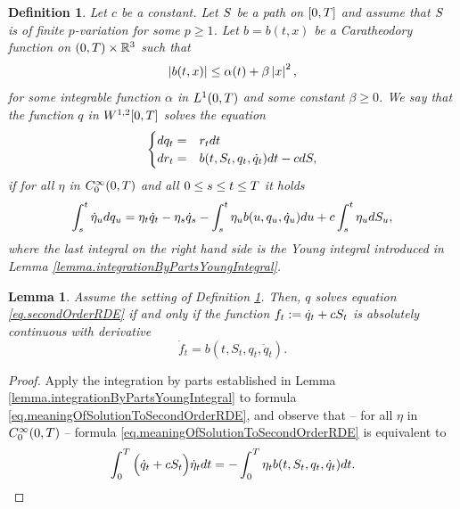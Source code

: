 \documentclass[10pt,a4paper]{article}
\newtheorem{defi}[thm]{Definition}
\newtheorem{lemma}[thm]{Lemma}
\begin{document}
\begin{appendices}
\begin{defi}\label{defi.solutionToSecondOrderRDE}
	Let $c$ be a constant. Let $S$ be  a path on ${[0,T]}$ and assume that $S$ is of finite $p$-variation for some $p\geq 1$. Let $b=b(t,x)$ be a Caratheodory function on $(0,T)\times \mathbb{R}^{3}$ such that 
	\begin{equation*}
	\left\lvert {b(t,x)} \right\rvert \leq \alpha(t) + \beta \left\lvert {x} \right\rvert^{2},
	\end{equation*}
	for some integrable function $\alpha$ in $L^1(0,T)$ and some constant $\beta \geq 0$. We say that the function $q$ in $W^{1,2}{[0,T]}$ solves the equation
	\begin{equation}\label{eq.secondOrderRDE}
	\begin{cases}
	dq_t =& r_t dt \\
	dr_t = & b(t,S_t,q_t,\dot{q}_t) dt - c dS,
	\end{cases}
	\end{equation}
	if for all $\eta$ in $C^{\infty}_{0}(0,T)$  and all $0\leq s\leq t \leq T$ it holds
	\begin{equation}\label{eq.meaningOfSolutionToSecondOrderRDE}
	\int_{s}^{t} \dot{\eta}_u dq_u = \eta_t \dot{q}_t - \eta_s \dot{q}_s - \int_{s}^{t} \eta_u b(u,q_u,\dot{q}_u) du + c\int_{s}^{t} \eta_u dS_u,
	\end{equation}
	where the last integral on the right hand side is the Young integral introduced in Lemma \ref{lemma.integrationByPartsYoungIntegral}. 
\end{defi}

\begin{lemma}\label{lemma.characterisationOfSolutionToSecondOrderRDE}
	Assume the setting of Definition \ref{defi.solutionToSecondOrderRDE}. Then, $q$ solves equation \eqref{eq.secondOrderRDE} if and only if the function $f_t:= \dot{q}_t + cS_t$ is absolutely continuous with derivative 
	\begin{equation*}
	\dot{f}_t = b(t,S_t,q_t,\dot{q}_t).
	\end{equation*}
\end{lemma}
\begin{proof}
	Apply the integration by parts established in Lemma \ref{lemma.integrationByPartsYoungIntegral}  to formula \eqref{eq.meaningOfSolutionToSecondOrderRDE}, and observe  that -- for   all $\eta$ in $C^{\infty}_{0}(0,T)$ --  formula \eqref{eq.meaningOfSolutionToSecondOrderRDE} is equivalent to 
	\begin{equation*}
	\int_{0}^{T} \Big(\dot{q}_t + c S_t \Big)\dot{\eta}_t dt
	 = - \int_{0}^{T} \eta_t b(t,S_t,q_t,\dot{q}_t) dt. 
	\end{equation*}
\end{proof}


\end{appendices}
\end{document}
